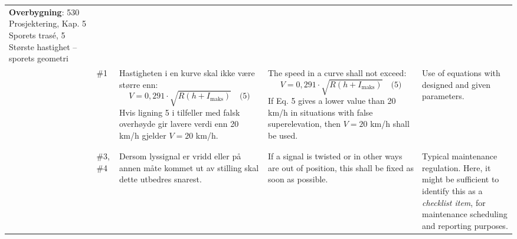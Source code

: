 \begin{longtable}[h]{L{0.5cm} L{0.8cm} L{4.0cm} L{4.0cm} L{5.0cm}}
{\textbf{Overbygning}: 530 Prosjektering, Kap. 5 Sporets trasé, 5 Største hastighet -- sporets geometri
} \\*
& \#1 & 
Hastigheten i en kurve skal ikke være større enn:
{\footnotesize
\begin{equation*}
V = 0,291 \cdot\sqrt{R\left(h +I_{\text{maks}}\right)}\quad \text{(5)}
\end{equation*}
}
Hvis ligning 5 i tilfeller med falsk overhøyde gir lavere verdi enn 20 km/h gjelder $V = 20$ km/h.
&
The speed in a curve shall not exceed:
{\footnotesize
\begin{equation*}
V = 0,291 \cdot\sqrt{R\left(h +I_{\text{maks}}\right)}\quad \text{(5)}
\end{equation*}
}
If Eq. 5 gives a lower value than 20 km/h in situations with false superelevation, then $V = 20$ km/h shall be used.
& 
Use of equations with designed and given parameters.\\
& & & & \\
 \\*
& \#3, \#4 & 
Dersom lyssignal er vridd eller på annen måte kommet ut av stilling skal dette utbedres snarest. 
&
If a signal is twisted or in other ways are out of position, this shall be fixed as soon as possible.
& 
Typical maintenance regulation. Here, it might be sufficient to identify this as a \emph{checklist item}, for 
maintenance scheduling and reporting purposes.
\end{longtable}

